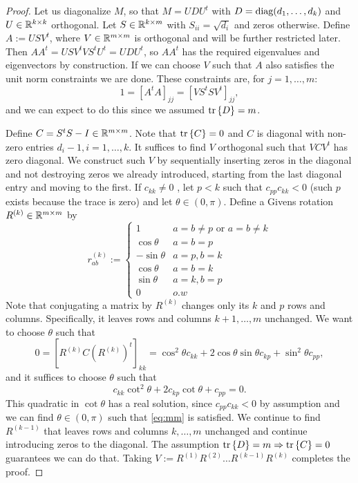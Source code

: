 \documentclass{amsart}
\numberwithin{equation}{section}
\begin{document}
\begin{proof}
  Let us diagonalize $M$, so that $M = U D U^t$ with $D =
  \textup{diag}(d_1,\dots,d_k)$ and $U \in \mathbb{R}^{k \times k }$ orthogonal. Let $S
  \in \mathbb{R}^{k \times m}$ with $S_{ii} = \sqrt{d_{i}}$ and zeros
  otherwise. Define $A:= U S V^t$, where $V \in \mathbb{R}^{m \times m}$ is
  orthogonal and will be further restricted later. Then $AA^t = U
  SV^tVS^t U^t = UDU^t$, so $AA^t$ has the required eigenvalues and
  eigenvectors by construction. If we can choose $V$ such that $A$
  also satisfies the unit norm constraints we are done. These
  constraints are, for $j=1,\dots,m$:
  \begin{equation}\label{eq:V constraints}
   1 = [A^tA]_{jj} = [V S^tS V^t]_{jj},
  \end{equation}
  and we can expect to do this since we assumed $\textup{tr}\left \{D \right \} = m$.

  Define $C = S^tS - I \in \mathbb{R}^{m \times m}$. Note that $\textup{tr}\left \{C \right \} = 0$ and
  $C$ is diagonal with non-zero entries $d_i-1,i=1,\dots,k$. It suffices
  to find $V$ orthogonal such that $V C V^t$ has zero diagonal. We
  construct such $V$ by sequentially inserting zeros in the diagonal
  and not destroying zeros we already introduced, starting from the
  last diagonal entry and moving to the first. If $c_{kk} \neq 0$ ,
  let $p < k$ such that $c_{pp}c_{kk} < 0$ (such $p$ exists because
  the trace is zero) and let $\theta \in (0,\pi)$. Define a Givens
  rotation $R^{(k)} \in \mathbb{R}^{m \times m}$ by
  \begin{equation*}
    r^{(k)}_{ab} :=
    \begin{cases}
      1 & a = b \neq p \text{ or } a = b \neq k \\
      \cos \theta & a = b = p  \\
     -\sin \theta & a = p, b = k\\
      \cos \theta & a = b = k \\
      \sin \theta & a = k, b = p \\ 
      0 & o.w
    \end{cases}
  \end{equation*}
  Note that conjugating a matrix by $R^{(k)}$ changes only its $k$ and
  $p$ rows and columns. Specifically, it leaves rows and columns
  $k+1,\dots,m$ unchanged. We want to choose $\theta$ such that
  \begin{equation}\label{eq:mm}
    0 = [R^{(k)} C (R^{(k)})^t]_{kk} = \cos^2 \theta c_{kk} + 2\cos \theta \sin
    \theta c_{kp} + \sin^2\theta c_{pp},
  \end{equation}
  and it suffices to choose $\theta$ such that
  \begin{equation*}
    c_{kk} \cot^2 \theta + 2 c_{kp} \cot \theta + c_{pp} = 0.
  \end{equation*}
  This quadratic in $\cot\theta$ has a real solution, since
  $c_{pp}c_{kk} < 0$ by assumption and we can find $\theta \in
  (0,\pi)$ such that \eqref{eq:mm} is satisfied. We continue to find
  $R^{(k-1)}$ that leaves rows and columns $k,\dots,m$ unchanged and
  continue introducing zeros to the diagonal. The assumption $\textup{tr}\left \{D \right \} =
  m \Rightarrow \textup{tr}\left \{C \right \} = 0$ guarantees we can do that. Taking $V:=
  R^{(1)} R^{(2)} \dots R^{(k-1)}R^{(k)}$ completes the proof.
\end{proof}
\end{document}
